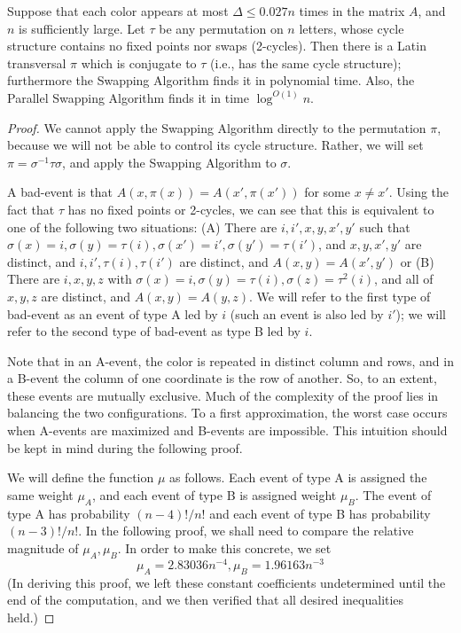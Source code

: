 \begin{theorem}
\label{thm:rainbow-cycles}
Suppose that each color appears at most $\Delta \leq 0.027 n$ times in the matrix $A$, and $n$ is sufficiently large.
Let $\tau$ be any permutation on $n$ letters, whose cycle structure contains no fixed points nor swaps (2-cycles). Then there is a Latin transversal $\pi$ which is conjugate to $\tau$ (i.e., has the same cycle structure); furthermore the Swapping Algorithm finds it in polynomial time. Also, the Parallel Swapping Algorithm finds it in time $\log^{O(1)} n$.
\end{theorem}
\begin{proof}
We cannot apply the Swapping Algorithm directly to the permutation $\pi$, because we will not be able to control its cycle structure. Rather, we will set $\pi = \sigma^{-1} \tau \sigma$, and apply the Swapping Algorithm to $\sigma$.

A bad-event is that $A(x, \pi(x)) = A(x', \pi(x'))$ for some $x \neq x'$. Using the fact that $\tau$ has no fixed points or 2-cycles, we can see that this is equivalent to one of the following two situations:  (A) There are $i, i', x, y, x', y'$ such that $\sigma(x) = i, \sigma(y) = \tau (i), \sigma(x') = i', \sigma(y') = \tau(i')$, and $x, y, x', y'$ are distinct, and $i, i', \tau(i), \tau(i')$ are distinct, and $A(x,y) = A(x', y')$ or (B) There are $i, x, y, z$ with $\sigma(x) = i, \sigma(y) = \tau(i), \sigma(z) = \tau^2(i)$, and all of $x,y,z$ are distinct, and $A(x,y) = A(y,z)$. We will refer to the first type of bad-event as an event of type A led by $i$ (such an event is also led by $i'$); we will refer to the second type of bad-event as type B led by $i$.


Note that in an A-event, the color is repeated in distinct column and rows, and in a B-event the column of one coordinate is the row of another. So, to an extent, these events are mutually exclusive. Much of the complexity of the proof lies in balancing the two configurations. To a first approximation, the worst case occurs when A-events are maximized and B-events are impossible. This intuition should be kept in mind during the following proof.

We will define the function $\mu$ as follows. Each event of type A is assigned the same weight $\mu_A$, and each event of type B is assigned weight $\mu_B$. The event of type A has probability $(n-4)!/n!$ and each event of type B has probability $(n-3)!/n!$. In the following proof, we shall need to compare the relative magnitude of $\mu_A, \mu_B$. In order to make this concrete, we set
$$
\mu_A = 2.83036 n^{-4}, \mu_B = 1.96163 n^{-3}
$$
(In deriving this proof, we left these constant coefficients undetermined until the end of the computation, and we then verified that all desired inequalities held.)


\end{proof}
